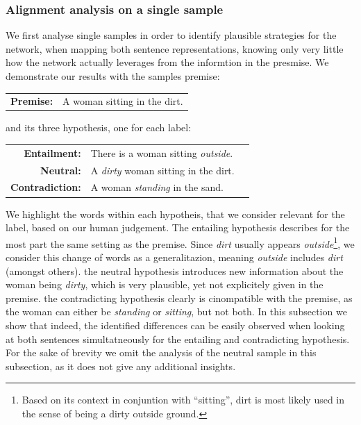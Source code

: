 \subsubsection{Alignment analysis on a single sample}
We first analyse single samples in order to identify plausible strategies for the network, when mapping both sentence representations, knowing only very little how the network actually leverages from the informtion in the presmise. We demonstrate our results with the samples premise:
\begin{center}
\begin{tabular}{rl}
	\textbf{Premise:} & A woman sitting in the dirt.
\end{tabular}
\end{center}
and its three hypothesis, one for each label:
\begin{center}
\begin{tabular}{rll}
	\textbf{Entailment:} & There is a woman sitting \textit{outside}. \\
	\textbf{Neutral:} & A \textit{dirty} woman sitting in the dirt. \\
	\textbf{Contradiction:} & A woman \textit{standing} in the sand. \\
\end{tabular}
\end{center}
We highlight the words within each hypotheis, that we consider relevant for the label, based on our human judgement. The entailing hypothesis describes for the most part the same setting as the premise. Since \textit{dirt} usually appears \textit{outside}\footnote{Based on its context in conjuntion with ``sitting'', dirt is most likely used in the sense of being a dirty outside ground.}, we consider this change of words as a generalitazion, meaning \textit{outside} includes \textit{dirt} (amongst others). the neutral hypothesis introduces new information about the woman being \textit{dirty}, which is very plausible, yet not explicitely given in the premise. the contradicting hypothesis clearly is cinompatible with the premise, as the woman can either be \textit{standing} or \textit{sitting}, but not both. In this subsection we show that indeed, the identified differences can be easily observed when looking at both sentences simultatneously for the entailing and contradicting hypothesis. For the sake  of brevity we omit the analysis of the neutral sample in this subsection, as it does not give any additional insights.

